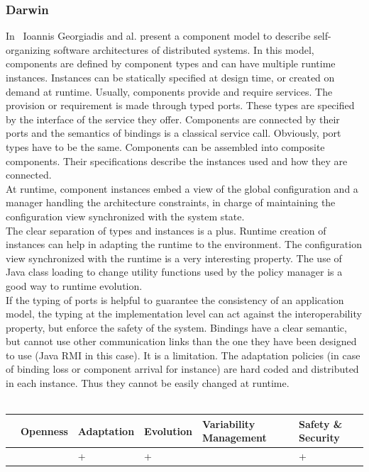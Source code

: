 \subsubsection{Darwin}

In~\cite{Georgiadis:2002} Ioannis Georgiadis and al. present a component model to describe self-organizing software architectures of distributed systems. In this model, components are defined by component types and can have multiple runtime instances. Instances can be statically specified at design time, or created on demand at runtime.
Usually, components provide and require services. The provision or requirement is made through typed ports. These types are specified by the interface of the service they offer.
Components are connected by their ports and the semantics of bindings is a classical service call. Obviously, port types have to be the same. Components can be assembled into composite components. Their specifications describe the instances used and how they are connected.\\
At runtime, component instances embed a view of the global configuration and a manager handling the architecture constraints, in charge of maintaining the configuration view synchronized with the system state.\\

The clear separation of types and instances is a plus. Runtime creation of instances can help in adapting the runtime to the environment. The configuration view synchronized with the runtime is a very interesting property. The use of Java class loading to change utility functions used by the policy manager is a good way to runtime evolution.\\
If the typing of ports is helpful to guarantee the consistency of an application model, the typing at the implementation level can act against the interoperability property, but enforce the safety of the system. Bindings have a clear semantic, but cannot use other communication links than the one they have been designed to use (Java RMI in this case). It is a limitation. The adaptation policies (in case of binding loss or component arrival for instance) are hard coded and distributed in each instance. Thus they cannot be easily changed at runtime.\\
\\
\begin{tabular}{ >{\centering}m{}| >{\centering}m{} >{\centering}m{}| >{\centering}m{} >{\centering}m{}| >{\centering\arraybackslash}m{}}
{\tiny Interoperability} & {\tiny Openness} & {\tiny Adaptation} & {\tiny Evolution} & {\tiny Variability Management} & {\tiny Safety \& Security}\\
 \hline
  &  & + & + &  & + \\ 
  \hline
\end{tabular}\\


